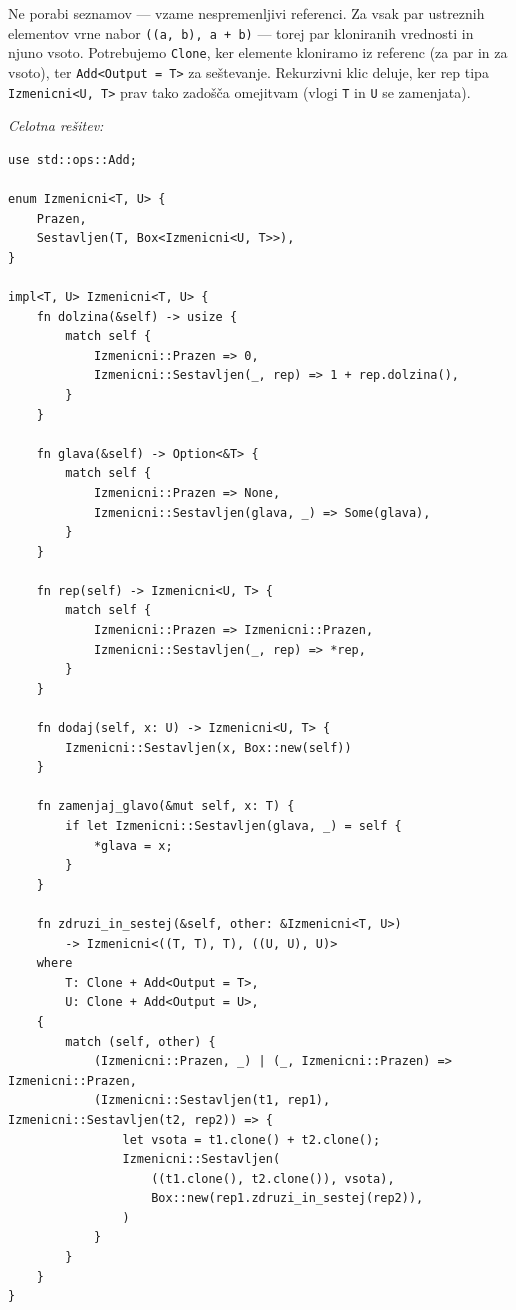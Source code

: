 \documentclass[arhiv]{../izpit}
\begin{document}
\noindent
Ne porabi seznamov — vzame nespremenljivi referenci. Za vsak par ustreznih elementov vrne nabor \texttt{((a, b), a + b)} — torej par kloniranih vrednosti in njuno vsoto. Potrebujemo \texttt{Clone}, ker elemente kloniramo iz referenc (za par in za vsoto), ter \texttt{Add<Output = T>} za seštevanje. Rekurzivni klic deluje, ker rep tipa \texttt{Izmenicni<U, T>} prav tako zadošča omejitvam (vlogi \texttt{T} in \texttt{U} se zamenjata).

\bigskip
\noindent
\emph{Celotna rešitev:}
\begin{verbatim}
use std::ops::Add;

enum Izmenicni<T, U> {
    Prazen,
    Sestavljen(T, Box<Izmenicni<U, T>>),
}

impl<T, U> Izmenicni<T, U> {
    fn dolzina(&self) -> usize {
        match self {
            Izmenicni::Prazen => 0,
            Izmenicni::Sestavljen(_, rep) => 1 + rep.dolzina(),
        }
    }

    fn glava(&self) -> Option<&T> {
        match self {
            Izmenicni::Prazen => None,
            Izmenicni::Sestavljen(glava, _) => Some(glava),
        }
    }

    fn rep(self) -> Izmenicni<U, T> {
        match self {
            Izmenicni::Prazen => Izmenicni::Prazen,
            Izmenicni::Sestavljen(_, rep) => *rep,
        }
    }

    fn dodaj(self, x: U) -> Izmenicni<U, T> {
        Izmenicni::Sestavljen(x, Box::new(self))
    }

    fn zamenjaj_glavo(&mut self, x: T) {
        if let Izmenicni::Sestavljen(glava, _) = self {
            *glava = x;
        }
    }

    fn zdruzi_in_sestej(&self, other: &Izmenicni<T, U>)
        -> Izmenicni<((T, T), T), ((U, U), U)>
    where
        T: Clone + Add<Output = T>,
        U: Clone + Add<Output = U>,
    {
        match (self, other) {
            (Izmenicni::Prazen, _) | (_, Izmenicni::Prazen) => Izmenicni::Prazen,
            (Izmenicni::Sestavljen(t1, rep1), Izmenicni::Sestavljen(t2, rep2)) => {
                let vsota = t1.clone() + t2.clone();
                Izmenicni::Sestavljen(
                    ((t1.clone(), t2.clone()), vsota),
                    Box::new(rep1.zdruzi_in_sestej(rep2)),
                )
            }
        }
    }
}
\end{verbatim}


\end{document}

